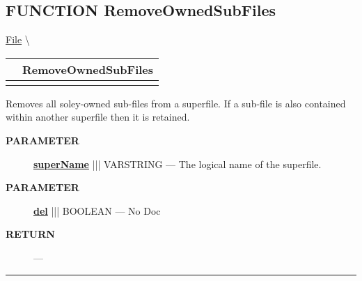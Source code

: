 \subsection*{\textsf{\colorbox{headtoc}{\color{white} FUNCTION}
RemoveOwnedSubFiles}}

\hypertarget{ecldoc:file.removeownedsubfiles}{}
\hspace{0pt} \hyperlink{ecldoc:File}{File} \textbackslash 

{\renewcommand{\arraystretch}{1.5}
\begin{tabularx}{\textwidth}{|>{\raggedright\arraybackslash}l|X|}
\hline
\hspace{0pt}\mytexttt{\color{red} } & \textbf{RemoveOwnedSubFiles} \\
\hline
\multicolumn{2}{|>{\raggedright\arraybackslash}X|}{\hspace{0pt}\mytexttt{\color{param} (varstring superName, boolean del=FALSE)}} \\
\hline
\end{tabularx}
}

\par





Removes all soley-owned sub-files from a superfile. If a sub-file is also contained within another superfile then it is retained.






\par
\begin{description}
\item [\colorbox{tagtype}{\color{white} \textbf{\textsf{PARAMETER}}}] \textbf{\underline{superName}} ||| VARSTRING --- The logical name of the superfile.
\item [\colorbox{tagtype}{\color{white} \textbf{\textsf{PARAMETER}}}] \textbf{\underline{del}} ||| BOOLEAN --- No Doc
\end{description}







\par
\begin{description}
\item [\colorbox{tagtype}{\color{white} \textbf{\textsf{RETURN}}}] \textbf{} --- 
\end{description}




\rule{\linewidth}{0.5pt}
